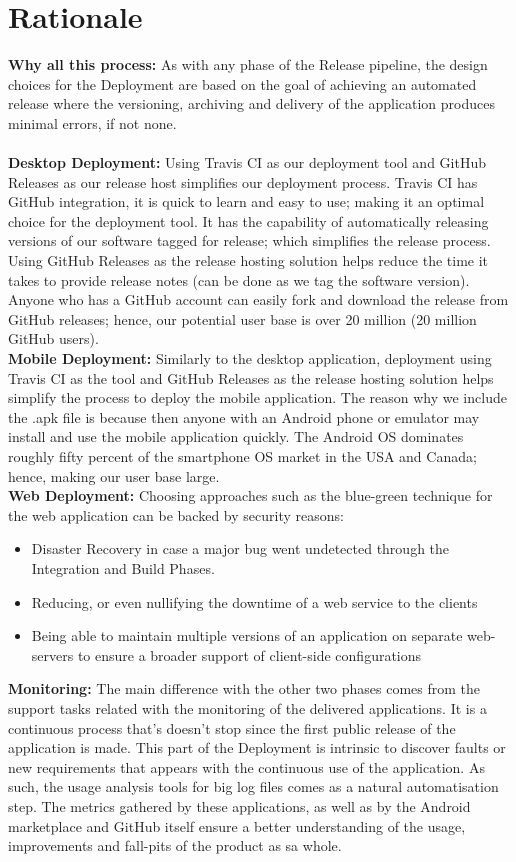 \documentclass[12pt]{report}
\begin{document}
\section{Rationale}
\textbf{Why all this process:} As with any phase of the Release pipeline, the design choices for the Deployment are based on the goal of achieving an automated release where the versioning, archiving and delivery of the application produces minimal errors, if not none.\\\\
\textbf{Desktop Deployment:} Using Travis CI as our deployment tool and GitHub Releases as our release host simplifies our deployment process. Travis CI has GitHub integration, it is quick to learn and easy to use; making it an optimal choice for the deployment tool. It has the capability of automatically releasing versions of our software tagged for release; which simplifies the release process. Using GitHub Releases as the release hosting solution helps reduce the time it takes to provide release notes (can be done as we tag the software version). Anyone who has a GitHub account can easily fork and download the release from GitHub releases; hence, our potential user base is over 20 million (20 million GitHub users).\\
\textbf{Mobile Deployment:} Similarly to the desktop application, deployment using Travis CI as the tool and GitHub Releases as the release hosting solution helps simplify the process to deploy the mobile application. The reason why we include the .apk file is because then anyone with an Android phone or emulator may install and use the mobile application quickly. The Android OS dominates roughly fifty percent of the smartphone OS market in the USA and Canada; hence, making our user base large.\\
\textbf{Web Deployment:} Choosing approaches such as the blue-green technique for the web application can be backed by security reasons: 
\begin{itemize}
    \item Disaster Recovery in case a major bug went undetected through the Integration and Build Phases.
    \item Reducing, or even nullifying the downtime of a web service to the clients
    \item Being able to maintain multiple versions of an application on separate web-servers to ensure a broader support of client-side configurations
\end{itemize}
\textbf{Monitoring:} The main difference with the other two phases comes from the support tasks
related with the monitoring of the delivered applications. It is a continuous process that's doesn't
stop since the first public release of the application is made. This part of the Deployment is
intrinsic to discover faults or new requirements that appears with the continuous use of the
application. As such, the usage analysis tools for big log files comes as a natural automatisation
step. The metrics gathered by these applications, as well as by the Android marketplace and GitHub
itself ensure a better understanding of the usage, improvements and fall-pits of the product as sa
whole.
\end{document}
